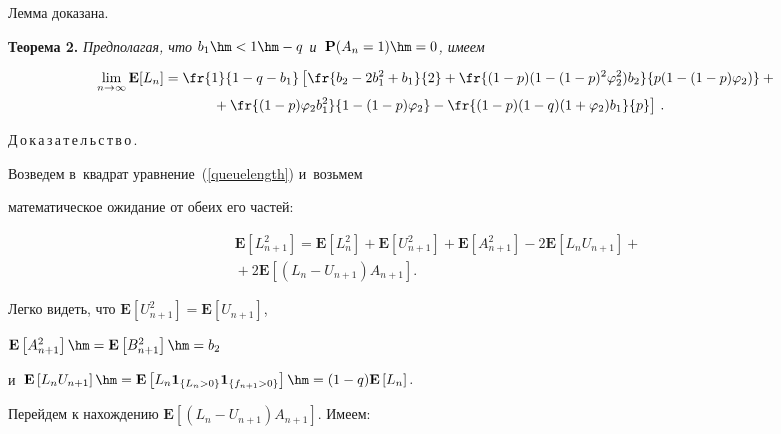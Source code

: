 Лемма доказана.



\smallskip



\noindent

\textbf{Теорема 2.} \textit{Предполагая, что $b_1\hm<1\hm-q$ и~$\mathbf{P}(A_n=1)\hm=0$, имеем}

\begin{multline*}

\lim_{n\to\infty}\mathbf{E}[L_n]=\fr{1}{1-q-b_1}\left[

\fr{b_2-2b_1^2+b_1}{2}+\fr{(1-p)(1-(1-p)^2\varphi_2^2)b_2}{p(1-(1-p)\varphi_2)}+{}\right.\\

\left.{}+\fr{(1-p)\varphi_2 b_1^2}{1-(1-p)\varphi_2}-

\fr{(1-p)(1-q)(1+\varphi_2)b_1}{p}\right]\,.

\end{multline*}



\noindent

Д\,о\,к\,а\,з\,а\,т\,е\,л\,ь\,с\,т\,в\,о\,.\ \

Возведем в~квадрат уравнение~(\ref{queuelength}) и~возьмем

математическое ожидание от обеих его частей:

\begin{multline}

\mathbf{E}\left[L_{n+1}^2\right]=\mathbf{E}\left[L_n^2\right]+

\mathbf{E}\left[U_{n+1}^2\right]+\mathbf{E}\left[A_{n+1}^2\right]-

2\mathbf{E}\left[L_n U_{n+1}\right]+{}\\

{}+2\mathbf{E}\left[(L_n-U_{n+1})A_{n+1}\right].

\label{squared}

\end{multline}

Легко видеть, что $\mathbf{E}\left[U_{n+1}^2\right]=\mathbf{E}\left[U_{n+1}\right]$,

$\mathbf{E}\left[A_{n+1}^2\right]\hm=\mathbf{E}\left[B_{n+1}^2\right]\hm=b_2$

и~$\mathbf{E}\left[L_n U_{n+1}\right]\hm=\mathbf{E}\left[L_n\mathbf{1}_{\{L_n>0\}}

\mathbf{1}_{\{f_{n+1}>0\}}\right]\hm=(1-q)\mathbf{E}\left[L_n\right].$

Перейдем к на\-хож\-де\-нию $\mathbf{E}[(L_n-U_{n+1})A_{n+1}]$. Имеем:

